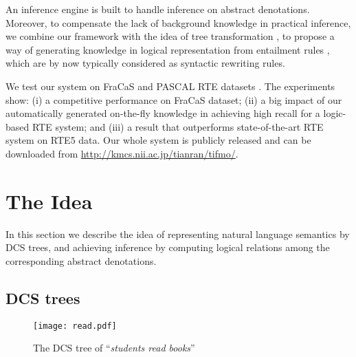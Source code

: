 \documentclass[11pt]{article}
\begin{document}
An inference engine is built to handle inference on abstract denotations. Moreover, to compensate 
the lack of background knowledge in practical inference, we combine our 
framework with the idea of tree 
transformation \cite{barheim07}, to propose a way of generating knowledge in 
logical representation from entailment rules \cite{szpektor07}, which are by now typically 
considered as syntactic rewriting rules. 

We test our system on FraCaS \cite{fracas} and PASCAL RTE datasets \cite{pascalrte}. 
The experiments show: (i) a competitive performance on FraCaS dataset; (ii) a big impact of 
our automatically generated on-the-fly knowledge in achieving high recall for a logic-based RTE system; 
and (iii) a result that outperforms state-of-the-art RTE system on RTE5 data. Our 
whole system is publicly released and can be downloaded from 
\url{http://kmcs.nii.ac.jp/tianran/tifmo/}.

\section{The Idea}
\label{sec:idea}

In this section we describe the idea of representing natural
language semantics by DCS trees, and achieving inference by computing logical 
relations among the corresponding abstract denotations.

\subsection{DCS trees}
\label{sec:dcstrees}

\begin{figure}[t]
\centering
\texttt{[image: read.pdf]}
\caption{The DCS tree of ``\emph{students read books}''}
\label{fig:dcstree}
\end{figure}
\end{document}
